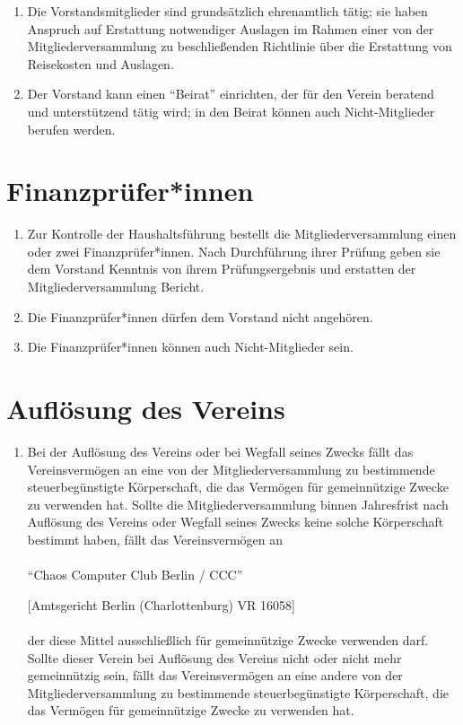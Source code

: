 \documentclass[a4paper]{article}
\begin{document}
\begin{enumerate}
    \item Die Vorstandsmitglieder sind grundsätzlich ehrenamtlich tätig; sie haben Anspruch auf Erstattung notwendiger Auslagen im Rahmen einer von der Mitgliederversammlung zu beschließenden Richtlinie über die Erstattung von Reisekosten und Auslagen.

    \item Der Vorstand kann einen \enquote{Beirat} einrichten, der für den Verein beratend und unterstützend tätig wird; in den Beirat können auch Nicht-Mitglieder berufen werden.

\end{enumerate}

\section{Finanzprüfer*innen}
\begin{enumerate}
    \item Zur Kontrolle der Haushaltsführung bestellt die Mitgliederversammlung einen oder zwei Finanzprüfer*innen. Nach Durchführung ihrer Prüfung geben sie dem Vorstand Kenntnis von ihrem Prüfungsergebnis und erstatten der Mitgliederversammlung Bericht.
    \item Die Finanzprüfer*innen dürfen dem Vorstand nicht angehören.
    \item Die Finanzprüfer*innen können auch Nicht-Mitglieder sein.
\end{enumerate}

\filbreak
\section{Auflösung des Vereins}
\begin{enumerate}
    \item Bei der Auflösung des Vereins oder bei Wegfall seines Zwecks fällt das Vereinsvermögen an eine von der Mitgliederversammlung zu bestimmende steuerbegünstigte Körperschaft, die das Vermögen für gemeinnützige Zwecke zu verwenden hat. Sollte die Mitgliederversammlung binnen Jahresfrist nach Auflösung des Vereins oder Wegfall seines Zwecks keine solche Körperschaft bestimmt haben, fällt das Vereinsvermögen an
    \\
    \\
    \enquote{Chaos Computer Club Berlin / CCC}

    [Amtsgericht Berlin (Charlottenburg) VR 16058]
    \\
    \\
    der diese Mittel ausschließlich für gemeinnützige Zwecke verwenden darf. Sollte dieser Verein bei Auflösung des Vereins nicht oder nicht mehr gemeinnützig sein, fällt das Vereinsvermögen an eine andere von der Mitgliederversammlung zu bestimmende steuerbegünstigte Körperschaft, die das Vermögen für gemeinnützige Zwecke zu verwenden hat.
\end{enumerate}
\end{document}
